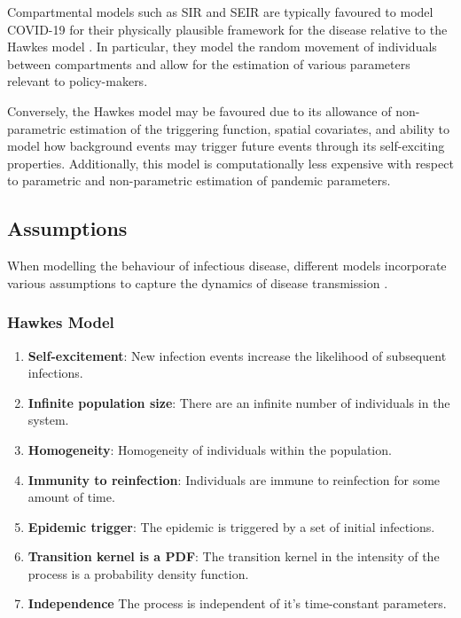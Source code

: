 \documentclass[12pt]{article}
\begin{document}
Compartmental models such as SIR and SEIR are typically favoured to model COVID-19 for their physically plausible framework for the disease relative to the Hawkes model \cite{Kresin2022}. In particular, they model the random movement of individuals between compartments and allow for the estimation of various parameters relevant to policy-makers. 

Conversely, the Hawkes model may be favoured due to its allowance of non-parametric estimation of the triggering function, spatial covariates, and ability to model how background events may trigger future events through its self-exciting properties. Additionally, this model is computationally less expensive with respect to parametric and non-parametric estimation of pandemic parameters. 



\subsection{Assumptions}
When modelling the behaviour of infectious disease, different models incorporate various assumptions to capture the dynamics of disease transmission \cite{Kresin2022, Lamprinakou2023}. 


\subsubsection{Hawkes Model}
\begin{enumerate}
\item {\bf Self-excitement}: New infection events increase the likelihood of subsequent infections. 
\item {\bf Infinite population size}: There are an infinite number of individuals in the system.
\item {\bf Homogeneity}: Homogeneity of individuals within the population.
\item {\bf Immunity to reinfection}: Individuals are immune to reinfection for some amount of time. 
\item {\bf Epidemic trigger}: The epidemic is triggered by a set of initial infections.
\item {\bf Transition kernel is a PDF}: The transition kernel in the intensity of the process is a probability density function. 
\item {\bf Independence} The process is independent of it's time-constant parameters. 
\end{enumerate}
\end{document}
